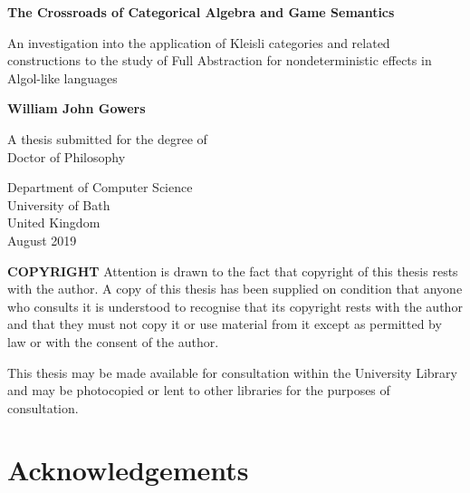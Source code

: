 \documentclass[11pt, a4paper, notitlepage]{report}
\begin{document}
\begin{titlepage}
  \begin{center}
    \Huge
    \textbf{The Crossroads of Categorical Algebra and Game Semantics}
 
    \vspace{0.2cm}
    \LARGE
    An investigation into the application of Kleisli categories and related constructions to the study of Full Abstraction for nondeterministic effects in Algol-like languages
 
    \vspace{0.3cm}
 
    \textbf{William John Gowers}
 
    A thesis submitted for the degree of\\
    Doctor of Philosophy
 
    \vspace{0.1cm}
 
    \Large
    Department of Computer Science\\
    University of Bath\\
    United Kingdom\\
    August 2019

    \textbf{COPYRIGHT}
    Attention is drawn to the fact that copyright of this thesis rests with the author. A copy of this thesis has
    been supplied on condition that anyone who consults it is understood to recognise that its copyright rests
    with the author and that they must not copy it or use material from it except as permitted by law or with
    the consent of the author. 
    
    This thesis may be made available for consultation within
    the University Library and may be photocopied or lent to other libraries
    for the purposes of consultation. \ul{\hspace{64pt}}
 
  \end{center}

\end{titlepage}

\addtocounter{page}{2}

\tableofcontents
\listoffigures
\clearpage

\section*{Acknowledgements}
\end{document}
